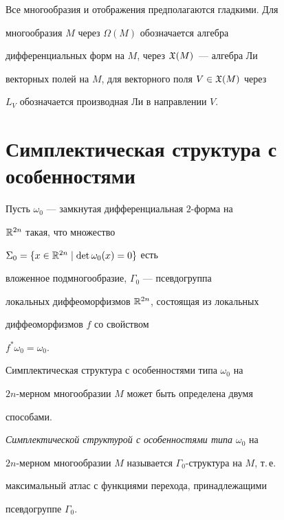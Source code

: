 Все многообразия и отображения предполагаются гладкими. Для


многообразия $M$ через $\Omega(M)$ обозначается алгебра


дифференциальных форм на $M$, через ${\frak X}(M)$~--- алгебра Ли


векторных полей на $M$, для векторного поля $V \in {\frak X}(M)$ через


$L_V$ обозначается производная Ли в направлении $V$.





\section{Симплектическая структура с особенностями}





Пусть $\omega_0$ --- замкнутая дифференциальная $2$-форма на


${\Bbb R}^{2n}$ такая, что множество


$\Sigma_0 = \{x \in {\Bbb R}^{2n} \mid \det\omega_0(x)=0\}$ есть


вложенное подмногообразие, $\Gamma_0$ --- псевдогруппа


локальных диффеоморфизмов ${\Bbb R}^{2n}$, состоящая из локальных


диффеоморфизмов $f$ со свойством


$f^*\omega_0 = \omega_0$.





Симплектическая структура с особенностями типа $\omega_0$ на


$2n$-мерном многообразии $M$ может быть определена двумя


способами.





\begin{defn} \label{def1}


{\em Симплектической структурой с особенностями типа $\omega_0$} на


$2n$-мерном многообразии $M$ называется $\Gamma_0$-структура на $M$, т.\,е.


максимальный атлас с функциями перехода, принадлежащими


псевдогруппе $\Gamma_0$.


\end{defn}





